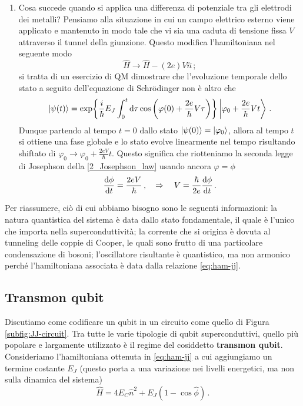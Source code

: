 \begin{enumerate}
    
    \item Cosa succede quando si applica una differenza di potenziale tra gli elettrodi dei metalli? Pensiamo alla situazione in cui un campo elettrico esterno viene applicato e mantenuto in modo tale che vi sia una caduta di tensione fissa $V$ attraverso il tunnel della giunzione. Questo modifica l'hamiltoniana nel seguente modo
    \begin{equation*}
        \hat H \longrightarrow \hat H -(2e)V\hat n \, ;
    \end{equation*}
    si tratta di un esercizio di QM dimostrare che l'evoluzione temporale dello stato a seguito dell'equazione di Schr\"odinger non è altro che 
    \begin{equation*}
        \ket{\psi(t)}=\exp{\frac{i}{\hbar}E_J\int_0^t\dd{\tau}\cos\left(\varphi(0)+\frac{2e}{\hbar}V\tau\right)}\ket{\varphi_0+\frac{2e}{\hbar}Vt} \, .
    \end{equation*}
    Dunque partendo al tempo $t=0$ dallo stato $\ket{\psi(0)} = \ket{\varphi_0}$, allora al tempo $t$ si ottiene una fase globale e lo stato evolve linearmente nel tempo risultando shiftato di $\varphi_0 \to \varphi_0 + \frac{2 e V}{\hbar} t$. Questo significa che riotteniamo la seconda legge di Josephson della \eqref{2_Josephson_law} usando ancora $\varphi=\phi$
    \begin{equation*}
        \dv{\phi}{t} = \frac{2 e V}{\hbar} \, , \quad \Rightarrow \quad V = \frac{\hbar}{2 e} \dv{\phi}{t} \, . 
    \end{equation*}
\end{enumerate}

\noindent Per riassumere, ciò di cui abbiamo bisogno sono le seguenti informazioni: la natura quantistica del sistema è data dallo stato fondamentale, il quale è l'unico che importa nella superconduttività; la corrente che si origina è dovuta al tunneling delle coppie di Cooper, le quali sono frutto di una particolare condensazione di bosoni; l'oscillatore risultante è quantistico, ma non armonico perché l'hamiltoniana associata è data dalla relazione \eqref{eq:ham-jj}. 

\subsection{Transmon qubit}
Discutiamo come codificare un qubit in un circuito come quello di Figura \ref{subfig:JJ-circuit}. Tra tutte le varie tipologie di qubit superconduttivi, quello più popolare e largamente utilizzato è il regime del cosiddetto \textbf{transmon qubit}. Consideriamo l'hamiltoniana ottenuta in \eqref{eq:ham-jj} a cui aggiungiamo un termine costante $E_J$ (questo porta a una variazione nei livelli energetici, ma non sulla dinamica del sistema)
\begin{equation*}
    \hat H = 4E_C\hat n^2 + E_J(1-\cos\hat\phi) \, .
\end{equation*}

